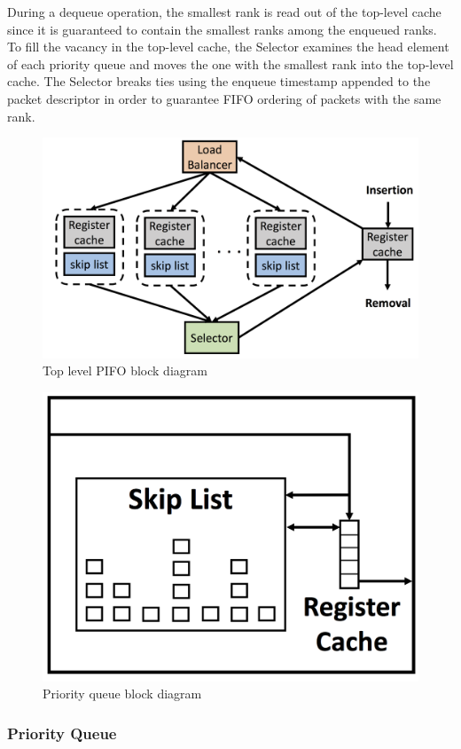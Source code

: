 During a dequeue operation, the smallest rank is read out of the top-level cache since it is guaranteed to contain the smallest ranks among the enqueued ranks.  To fill the vacancy in the top-level cache, the Selector examines the head element of each priority queue and moves the one with the smallest rank into the top-level cache. The Selector breaks ties using the enqueue timestamp appended to the packet descriptor in order to guarantee FIFO ordering of packets with the same rank.

\begin{figure}[!ht]
\includegraphics[width=1\linewidth]{figures/design/pifo-top}
\caption{Top level PIFO block diagram}
\label{fig:pifo-top}
\end{figure}

\begin{figure}[!ht]
\includegraphics[width=0.7\linewidth]{figures/design/priority-queue}
\caption{Priority queue block diagram}
\label{fig:priority-queue}
\end{figure}

\subsubsection{Priority Queue}\label{sec:priority-queue}

